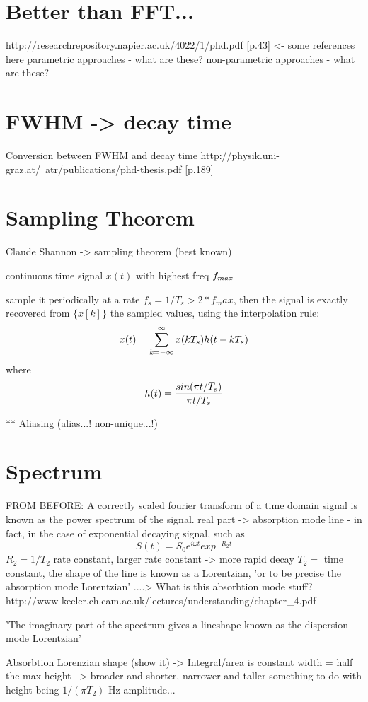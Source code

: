 \section{Better than FFT...}
http://researchrepository.napier.ac.uk/4022/1/phd.pdf [p.43] <- some references
here parametric approaches - what are these? non-parametric approaches - what
are these?

\section{FWHM -> decay time} Conversion between FWHM and decay time
http://physik.uni-graz.at/~atr/publications/phd-thesis.pdf [p.189]

\section{Sampling Theorem}

Claude Shannon -> sampling theorem (best known)

continuous time signal $x(t)$ with highest freq $f_{max}$

sample it periodically at a rate $f_s = 1/T_s > 2*f_max$, then the signal is
exactly recovered from $\{x[k]\}$ the sampled values, using the interpolation
rule:
$$
x(t) = \sum_{k=-\infty}^{\infty} x(k T_s) h(t - k T_s)
$$
where
$$
h(t) = \frac{sin(\pi t / T_s)}{\pi t / T_s}
$$

** Aliasing (alias...! non-unique...!)


\section{Spectrum} FROM BEFORE: A correctly scaled fourier transform of a time
domain signal is known as the power spectrum of the signal. real part ->
absorption mode line - in fact, in the case of exponential decaying signal, such
as
$$
  S(t) = S_0 e^{i \omega t}exp^{ -R_2 t }
$$
$R_2 = 1 / T_2$ rate constant, larger rate constant -> more rapid decay $T_2 = $
time constant, the shape of the line is known as a Lorentzian, 'or to be precise
the absorption mode Lorentzian' ....> What is this absorbtion mode stuff? %
http://www-keeler.ch.cam.ac.uk/lectures/understanding/chapter_4.pdf

'The imaginary part of the spectrum gives a lineshape known as the dispersion
mode Lorentzian'

Absorbtion Lorenzian shape (show it) -> Integral/area is constant width = half
the max height --> broader and shorter, narrower and taller something to do with
height being $1/(\pi T_2)$ Hz %
amplitude...

